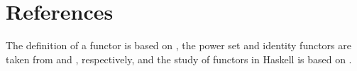 \section{References}
\label{sec:functors-references}

The definition of a functor is based on
\parencites[13]{maclane-1998}[428]{poigne-1992}, the power set and
identity functors are taken from \parencites[431]{poigne-1992} and
\parencite[11]{marquis-2013}, respectively, and the study of functors
in Haskell is based on \parencites[146--150,
  218--227]{lipovaca-2011}[18--23]{yorgey-2009}.

\clearemptydoublepage
